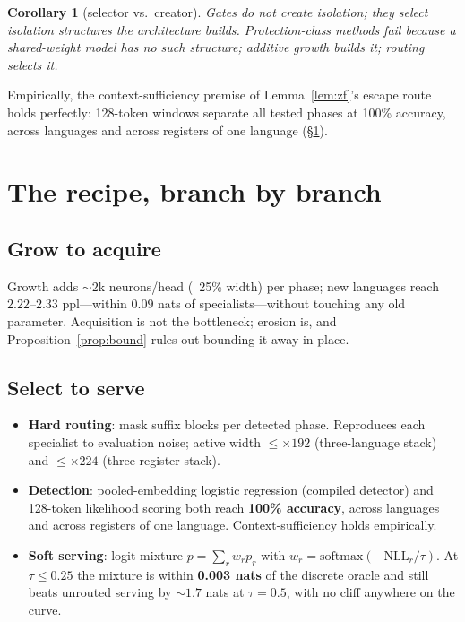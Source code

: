 \documentclass[11pt]{article}
\newtheorem{corollary}{Corollary}
\theoremstyle{remark}\newtheorem{remark}{Remark}
\begin{document}
\begin{corollary}[selector vs.\ creator]\label{cor:sel}
Gates do not create isolation; they \emph{select} isolation structures the architecture
builds. Protection-class methods fail because a shared-weight model has no such structure;
additive growth builds it; routing selects it.
\end{corollary}

Empirically, the context-sufficiency premise of Lemma~\ref{lem:zf}'s escape route holds
perfectly: 128-token windows separate all tested phases at 100\% accuracy, across languages
and across registers of one language (\S\ref{sec:recipe}).

\section{The recipe, branch by branch}
\label{sec:recipe}

\subsection{Grow to acquire}
Growth adds ${\sim}2$k neurons/head (~25\% width) per phase; new languages reach
$2.22$--$2.33$ ppl---within $0.09$ nats of specialists---without touching any old parameter.
Acquisition is not the bottleneck; erosion is, and Proposition~\ref{prop:bound} rules out
bounding it away in place.

\subsection{Select to serve}
\begin{itemize}\itemsep2pt
\item \textbf{Hard routing}: mask suffix blocks per detected phase. Reproduces each
specialist to evaluation noise; active width $\le\times192$ (three-language stack) and
$\le\times224$ (three-register stack).
\item \textbf{Detection}: pooled-embedding logistic regression (compiled detector) and
128-token likelihood scoring both reach \textbf{100\% accuracy}, across languages and across
registers of one language. Context-sufficiency holds empirically.
\item \textbf{Soft serving}: logit mixture $p=\sum_r w_r p_r$ with
$w_r=\mathrm{softmax}(-\mathrm{NLL}_r/\tau)$. At $\tau\le0.25$ the mixture is within
\textbf{0.003 nats} of the discrete oracle and still beats unrouted serving by
${\sim}1.7$ nats at $\tau=0.5$, with no cliff anywhere on the curve.
\end{itemize}
\end{document}
